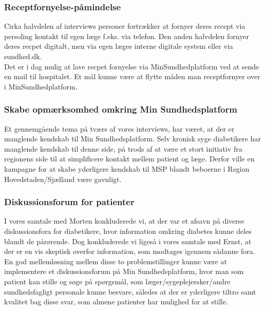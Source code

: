 \subsubsection{Receptfornyelse-påmindelse}
Cirka halvdelen af interviews personer fortrækker at fornyer deres recept via persoling kontakt til egen læge f.eks. via telefon. Den anden halvdelen fornyer deres recpet digitalt, men via egen læges interne digitale system eller via sundhed.dk. \\
Det er i dag mulig at lave recpet fornyelse via MinSundhedplatform ved at sende en mail til hospitalet. Et mål kunne være at flytte måden man receptfornyer over i MinSundhedplatform.

\subsubsection{Skabe opmærksomhed omkring Min Sundhedsplatform}
Et gennemgående tema på tværs af vores interviews, har været, at der er manglende kendskab til Min Sundhedsplatform. Selv kronisk syge diabetikere har manglende kendskab til denne side, på trods af at være et stort initiativ fra regionens side til at simplificere kontakt mellem patient og læge. Derfor ville en kampagne for at skabe yderligere kendskab til MSP blandt beboerne i Region Hovedstaden/Sjælland være gavnligt.

\subsubsection{Diskussionsforum for patienter}
I vores samtale med Morten konkluderede vi, at der var et afsavn på diverse diskussionsfora for diabetikere, hvor information omkring diabetes kunne deles blandt de pårørende.
Dog konkluderede vi ligeså i vores samtale med Ernst, at der er en vis skeptisk overfor information, som modtages igennem sådanne fora. En god mellemløsning mellem disse to problemstillinger kunne være at implementere et diskussionsforum på Min Sundhedsplatform, hvor man som patient kan stille og søge på spørgsmål, som læger/sygeplejersker/andre sundhedsfagligt personale kunne besvare, således at der er yderligere tiltro samt kvalitet bag disse svar, som almene patienter har mulighed for at stille. 
